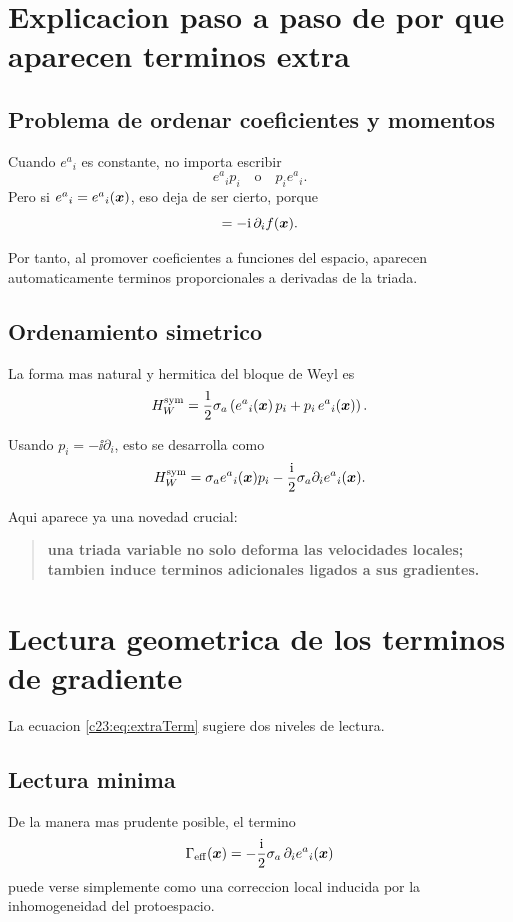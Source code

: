 \section{Explicacion paso a paso de por que aparecen terminos extra}
\subsection{Problema de ordenar coeficientes y momentos}
Cuando \(e^a{}_i\) es constante, no importa escribir
\[
e^a{}_i p_i
\quad\text{o}\quad
p_i e^a{}_i.
\]
Pero si \(e^a{}_i=e^a{}_i(\bm{x})\), eso deja de ser cierto, porque
\begin{equation}
[p_i,f(\vx)] = -\ii\,\partial_i f(\vx).
\end{equation}

Por tanto, al promover coeficientes a funciones del espacio, aparecen automaticamente terminos proporcionales a derivadas de la triada.

\subsection{Ordenamiento simetrico}
La forma mas natural y hermitica del bloque de Weyl es
\begin{equation}
H_W^{\mathrm{sym}}
=
\frac{1}{2}\sigma_a\left(e^a{}_i(\bm{x})\,p_i + p_i\,e^a{}_i(\bm{x})\right).
\label{c23:eq:symWeyl}
\end{equation}

Usando \(p_i=-\ii\partial_i\), esto se desarrolla como
\begin{equation}
H_W^{\mathrm{sym}}
=
\sigma_a e^a{}_i(\bm{x})p_i
-\frac{\mathrm{i}}{2}\sigma_a \partial_i e^a{}_i(\bm{x}).
\label{c23:eq:extraTerm}
\end{equation}

Aqui aparece ya una novedad crucial:
\begin{quote}
\textbf{una triada variable no solo deforma las velocidades locales; tambien induce terminos adicionales ligados a sus gradientes.}
\end{quote}

\section{Lectura geometrica de los terminos de gradiente}
La ecuacion \eqref{c23:eq:extraTerm} sugiere dos niveles de lectura.

\subsection{Lectura minima}
De la manera mas prudente posible, el termino
\begin{equation}
\Gamma_{\mathrm{eff}}(\bm{x})
=
-\frac{\mathrm{i}}{2}\sigma_a\,\partial_i e^a{}_i(\bm{x})
\end{equation}
puede verse simplemente como una correccion local inducida por la inhomogeneidad del protoespacio.


